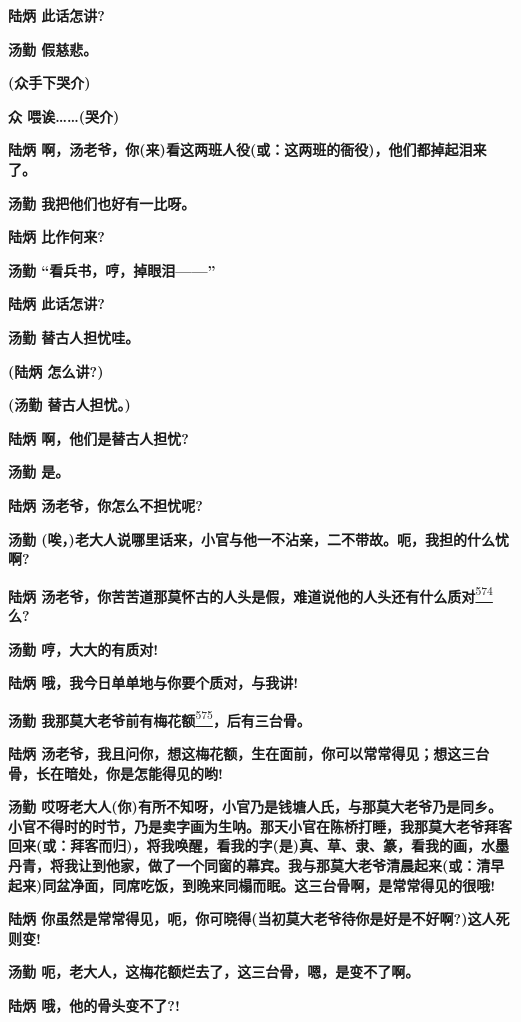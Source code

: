 \textbf{陆炳 此话怎讲?}

\textbf{汤勤 假慈悲。}

\textbf{(众手下哭介)}

\textbf{众 喂诶\ldots{}\ldots{}(哭介)}

\textbf{陆炳
啊，汤老爷，你(来)看这两班人役(或：这两班的衙役)，他们都掉起泪来了。}

\textbf{汤勤 我把他们也好有一比呀。}

\textbf{陆炳 比作何来?}

\textbf{汤勤 ``看兵书，哼，掉眼泪------''}

\textbf{陆炳 此话怎讲?}

\textbf{汤勤 替古人担忧哇。}

\textbf{(陆炳 怎么讲?)}

\textbf{(汤勤 替古人担忧。)}

\textbf{陆炳 啊，他们是替古人担忧?}

\textbf{汤勤 是。}

\textbf{陆炳 汤老爷，你怎么不担忧呢?}

\textbf{汤勤
(唉，)老大人说哪里话来，小官与他一不沾亲，二不带故。呃，我担的什么忧啊?}

\textbf{陆炳
汤老爷，你苦苦道那莫怀古的人头是假，难道说他的人头还有什么质对}\protect\hyperlink{fn574}{\textsuperscript{574}}\textbf{么?}

\textbf{汤勤 哼，大大的有质对!}

\textbf{陆炳 哦，我今日单单地与你要个质对，与我讲!}

\textbf{汤勤
我那莫大老爷前有梅花额}\protect\hyperlink{fn575}{\textsuperscript{575}}\textbf{，后有三台骨。}

\textbf{陆炳
汤老爷，我且问你，想这梅花额，生在面前，你可以常常得见；想这三台骨，长在暗处，你是怎能得见的哟!}

\textbf{汤勤
哎呀老大人(你)有所不知呀，小官乃是钱塘人氏，与那莫大老爷乃是同乡。小官不得时的时节，乃是卖字画为生呐。那天小官在陈桥打睡，我那莫大老爷拜客回来(或：拜客而归)，将我唤醒，看我的字(是)真、草、隶、篆，看我的画，水墨丹青，将我让到他家，做了一个同窗的幕宾。我与那莫大老爷清晨起来(或：清早起来)同盆净面，同席吃饭，到晚来同榻而眠。这三台骨啊，是常常得见的很哦!}

\textbf{陆炳
你虽然是常常得见，呃，你可晓得(当初莫大老爷待你是好是不好啊?)这人死则变!}

\textbf{汤勤 呃，老大人，这梅花额烂去了，这三台骨，嗯，是变不了啊。}

\textbf{陆炳 哦，他的骨头变不了?!}

